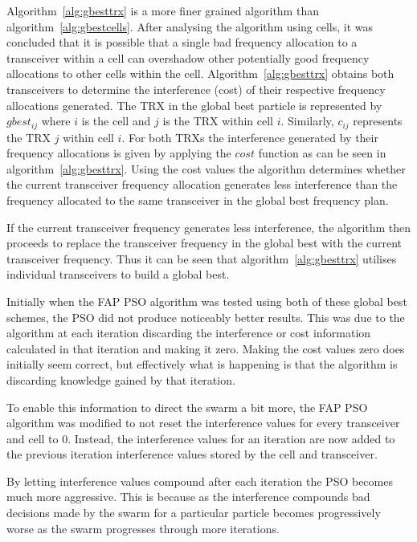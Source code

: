 Algorithm~\ref{alg:gbesttrx} is a more finer grained algorithm than algorithm~\ref{alg:gbestcells}. After analysing the algorithm using cells, it was concluded that it is possible that a single bad frequency allocation to a transceiver within a cell can overshadow other potentially good frequency allocations to other cells within the cell. Algorithm~\ref{alg:gbesttrx} obtains both transceivers to determine the interference (cost) of their respective frequency allocations generated. The TRX in the global best particle is represented by $gbest_{ij}$ where $i$ is the cell and $j$ is the TRX within cell $i$. Similarly, $c_{ij}$ represents the TRX $j$ within cell $i$. For both TRXs the interference generated by their frequency allocations is given by applying the $cost$ function as can be seen in algorithm~\ref{alg:gbesttrx}. Using the cost values the algorithm determines whether the current transceiver frequency allocation generates less interference than the frequency allocated to the same transceiver in the global best frequency plan.

If the current transceiver frequency generates less interference, the algorithm then proceeds to replace the transceiver frequency in the global best with the current transceiver frequency. Thus it can be seen that algorithm~\ref{alg:gbesttrx} utilises individual transceivers to build a global best.

Initially when the \gls{FAP} \gls{PSO} algorithm was tested using both of these global best schemes, the \gls{PSO} did not produce noticeably better results. This was due to the algorithm at each iteration discarding the interference or cost information calculated in that iteration and making it zero. Making the cost values zero does initially seem correct, but effectively what is happening is that the algorithm is discarding knowledge gained by that iteration.

To enable this information to direct the swarm a bit more, the \gls{FAP} \gls{PSO} algorithm was modified to not reset the interference values for every transceiver and cell to 0. Instead, the interference values for an iteration are now added to the previous iteration interference values stored by the cell and transceiver. 

By letting interference values compound after each iteration the \gls{PSO} becomes much more aggressive. This is because as the interference compounds bad decisions made by the swarm for a particular particle becomes progressively worse as the swarm progresses through more iterations.

